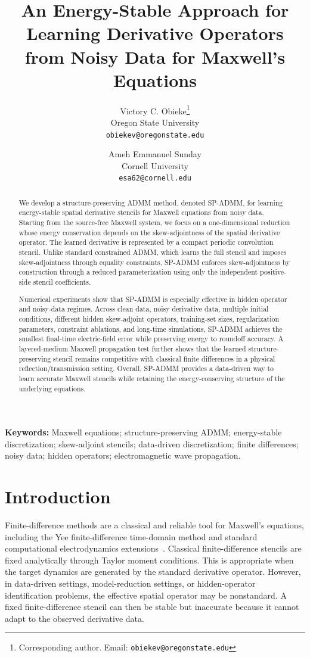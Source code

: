 \documentclass[11pt]{article}
\title{\textbf{An Energy-Stable Approach for Learning Derivative Operators from Noisy Data for Maxwell’s Equations}}
\author{
Victory C. Obieke\thanks{Corresponding author. Email: \texttt{obiekev@oregonstate.edu}}\\
Oregon State University\\
\texttt{obiekev@oregonstate.edu}
\and
Ameh Emmanuel Sunday\\
Cornell University\\
\texttt{esa62@cornell.edu}
}
\date{}
\numberwithin{equation}{section}
\numberwithin{figure}{section}
\numberwithin{table}{section}
\begin{document}
\maketitle

\begin{abstract}
We develop a structure-preserving ADMM method, denoted SP-ADMM, for learning
energy-stable spatial derivative stencils for Maxwell equations from noisy
data. Starting from the source-free Maxwell system, we focus on a
one-dimensional reduction whose energy conservation depends on the
skew-adjointness of the spatial derivative operator. The learned derivative is
represented by a compact periodic convolution stencil. Unlike standard
constrained ADMM, which learns the full stencil and imposes skew-adjointness
through equality constraints, SP-ADMM enforces skew-adjointness by construction
through a reduced parameterization using only the independent positive-side
stencil coefficients.

Numerical experiments show that SP-ADMM is especially effective in hidden
operator and noisy-data regimes. Across clean data, noisy derivative data,
multiple initial conditions, different hidden skew-adjoint operators,
training-set sizes, regularization parameters, constraint ablations, and
long-time simulations, SP-ADMM achieves the smallest final-time electric-field
error while preserving energy to roundoff accuracy. A layered-medium Maxwell
propagation test further shows that the learned structure-preserving stencil
remains competitive with classical finite differences in a physical
reflection/transmission setting. Overall, SP-ADMM provides a data-driven way
to learn accurate Maxwell stencils while retaining the energy-conserving
structure of the underlying equations.
\end{abstract}
\noindent\textbf{Keywords:}
Maxwell equations; structure-preserving ADMM; energy-stable discretization;
skew-adjoint stencils; data-driven discretization; finite differences;
noisy data; hidden operators; electromagnetic wave propagation.
\section{Introduction}
\label{sec:intro}

Finite-difference methods are a classical and reliable tool for Maxwell's
equations, including the Yee finite-difference time-domain method and standard
computational electrodynamics extensions~\cite{yee1966numerical,taflove2000computational}. Classical finite-difference stencils are fixed analytically through Taylor
moment conditions. This is appropriate when the target dynamics are generated
by the standard derivative operator. However, in data-driven settings,
model-reduction settings, or hidden-operator identification problems, the
effective spatial operator may be nonstandard. A fixed finite-difference
stencil can then be stable but inaccurate because it cannot adapt to the
observed derivative data.
\end{document}
